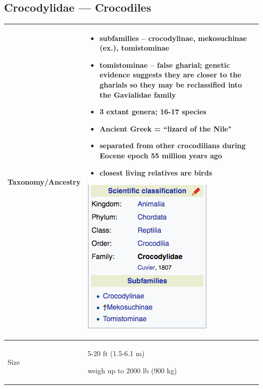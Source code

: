 
\subsection{Crocodylidae --- Crocodiles}
\begin{center}
\begin{longtabu} to 
	\hline
	Taxonomy/Ancestry & 
	\begin{itemize}[noitemsep]
		\item subfamilies -- crocodylinae, mekosuchinae (ex.), tomistominae
		\item \textbf{tomistominae} -- false gharial; genetic evidence suggests they are closer to the gharials so they may be reclassified into the Gavialidae family
		\item 3 extant genera; 16-17 species
		\item Ancient Greek = ``lizard of the Nile"
		\item separated from other crocodilians during Eocene epoch 55 million years ago
		\item closest living relatives are birds
	\end{itemize}
	
	\begin{center} \includegraphics[scale=0.5]{crocodylia/crocodylidae/crocodylidae.png} \end{center}
	\\
	\hline
	Size & 
	5-20 ft (1.5-6.1 m)
	
	weigh up to 2000 lb (900 kg)
	

\end{longtabu}
\end{center}
